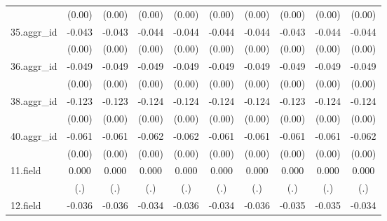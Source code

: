 {\begin{tabular}{l*{9}{c}}
          &   (0.00)         &   (0.00)         &   (0.00)         &   (0.00)         &   (0.00)         &   (0.00)         &   (0.00)         &   (0.00)         &   (0.00)         \\
[1em]
35.aggr\_id&   -0.043\sym{***}&   -0.043\sym{***}&   -0.044\sym{***}&   -0.044\sym{***}&   -0.044\sym{***}&   -0.044\sym{***}&   -0.043\sym{***}&   -0.044\sym{***}&   -0.044\sym{***}\\
          &   (0.00)         &   (0.00)         &   (0.00)         &   (0.00)         &   (0.00)         &   (0.00)         &   (0.00)         &   (0.00)         &   (0.00)         \\
[1em]
36.aggr\_id&   -0.049\sym{***}&   -0.049\sym{***}&   -0.049\sym{***}&   -0.049\sym{***}&   -0.049\sym{***}&   -0.049\sym{***}&   -0.049\sym{***}&   -0.049\sym{***}&   -0.049\sym{***}\\
          &   (0.00)         &   (0.00)         &   (0.00)         &   (0.00)         &   (0.00)         &   (0.00)         &   (0.00)         &   (0.00)         &   (0.00)         \\
[1em]
38.aggr\_id&   -0.123\sym{***}&   -0.123\sym{***}&   -0.124\sym{***}&   -0.124\sym{***}&   -0.124\sym{***}&   -0.124\sym{***}&   -0.123\sym{***}&   -0.124\sym{***}&   -0.124\sym{***}\\
          &   (0.00)         &   (0.00)         &   (0.00)         &   (0.00)         &   (0.00)         &   (0.00)         &   (0.00)         &   (0.00)         &   (0.00)         \\
[1em]
40.aggr\_id&   -0.061\sym{***}&   -0.061\sym{***}&   -0.062\sym{***}&   -0.062\sym{***}&   -0.061\sym{***}&   -0.061\sym{***}&   -0.061\sym{***}&   -0.061\sym{***}&   -0.062\sym{***}\\
          &   (0.00)         &   (0.00)         &   (0.00)         &   (0.00)         &   (0.00)         &   (0.00)         &   (0.00)         &   (0.00)         &   (0.00)         \\
[1em]
11.field  &    0.000         &    0.000         &    0.000         &    0.000         &    0.000         &    0.000         &    0.000         &    0.000         &    0.000         \\
          &      (.)         &      (.)         &      (.)         &      (.)         &      (.)         &      (.)         &      (.)         &      (.)         &      (.)         \\
[1em]
12.field  &   -0.036\sym{***}&   -0.036\sym{***}&   -0.034\sym{***}&   -0.036\sym{***}&   -0.034\sym{***}&   -0.036\sym{***}&   -0.035\sym{***}&   -0.035\sym{***}&   -0.034\sym{***}\\

\end{tabular}}
